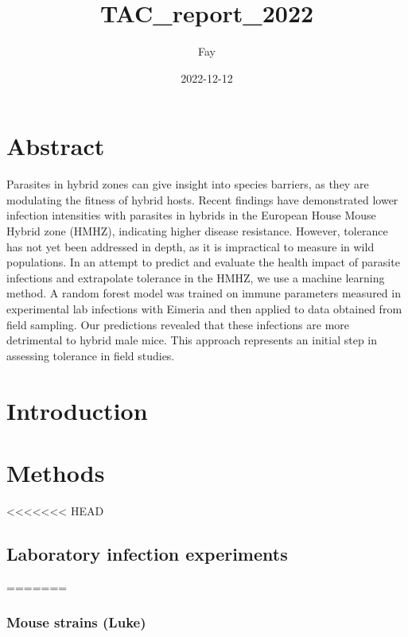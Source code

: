 \documentclass[
]{article}
\title{TAC\_report\_2022}
\author{Fay}
\date{2022-12-12}
\begin{document}
\maketitle

\hypertarget{abstract}{%
\section{Abstract}\label{abstract}}

Parasites in hybrid zones can give insight into species barriers, as
they are modulating the fitness of hybrid hosts. Recent findings have
demonstrated lower infection intensities with parasites in hybrids in
the European House Mouse Hybrid zone (HMHZ), indicating higher disease
resistance. However, tolerance has not yet been addressed in depth, as
it is impractical to measure in wild populations. In an attempt to
predict and evaluate the health impact of parasite infections and
extrapolate tolerance in the HMHZ, we use a machine learning method. A
random forest model was trained on immune parameters measured in
experimental lab infections with Eimeria and then applied to data
obtained from field sampling. Our predictions revealed that these
infections are more detrimental to hybrid male mice. This approach
represents an initial step in assessing tolerance in field studies.

\hypertarget{introduction}{%
\section{Introduction}\label{introduction}}

\hypertarget{methods}{%
\section{Methods}\label{methods}}

<<<<<<< HEAD
\hypertarget{laboratory-infection-experiments}{%
\subsection{Laboratory infection
experiments}\label{laboratory-infection-experiments}}
=======
\hypertarget{mouse-strains-luke}{%
\subsubsection{Mouse strains (Luke)}\label{mouse-strains-luke}}
\end{document}
